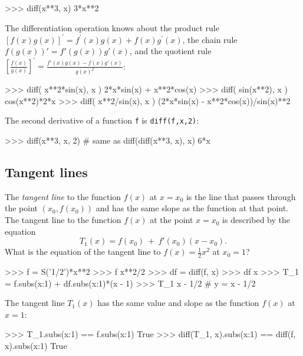 \small
\begin{verbatimtab}
>>> diff(x**3, x)
3*x**2
\end{verbatimtab}
\normalsize

\noindent
The differentiation operation knows about the product rule $[f(x)g(x)]^\prime=f^\prime(x)g(x)+f(x)g^\prime(x)$, 
the chain rule $f(g(x))' = f'(g(x))g'(x)$, 
and the quotient rule $\left[\frac{f(x)}{g(x)}\right]^\prime = \frac{f'(x)g(x) - f(x)g'(x)}{g(x)^2}$:



\small
\begin{verbatimtab}
>>> diff( x**2*sin(x), x )
2*x*sin(x) + x**2*cos(x)
>>> diff( sin(x**2), x )
cos(x**2)*2*x
>>> diff( x**2/sin(x), x )
(2*x*sin(x) - x**2*cos(x))/sin(x)**2
\end{verbatimtab}
\normalsize

\noindent
The second derivative of a function \texttt{f} is \texttt{diff(f,x,2)}:



\small
\begin{verbatimtab}
>>> diff(x**3, x, 2)       # same as diff(diff(x**3, x), x)
6*x
\end{verbatimtab}
\normalsize



\subsection{Tangent lines}
\label{calculus:tangent_lines}

The \emph{tangent line} to the function $f(x)$ at $x=x_0$ is 
the line that passes through the point $(x_0, f(x_0))$ and has 
the same slope as the function at that point.
The tangent line to the function $f(x)$ at the point $x=x_0$ is described by the equation
\[
   T_1(x) =  f(x_0) \ + \  f'(x_0)(x-x_0).
\]
What is the equation of the tangent line to $f(x)=\frac{1}{2}x^2$ at $x_0=1$?



\small
\begin{verbatimtab}
>>> f = S('1/2')*x**2
>>> f
x**2/2
>>> df = diff(f, x)
>>> df
x
>>> T_1 = f.subs({x:1}) + df.subs({x:1})*(x - 1)
>>> T_1
x - 1/2           #  y = x - 1/2
\end{verbatimtab}
\normalsize

\noindent
The tangent line $T_1(x)$ has the same value and slope as the function $f(x)$ at $x=1$:
\small
\begin{verbatimtab}
>>> T_1.subs({x:1}) == f.subs({x:1})
True
>>> diff(T_1, x).subs({x:1}) == diff(f, x).subs({x:1})
True
\end{verbatimtab}
\normalsize

